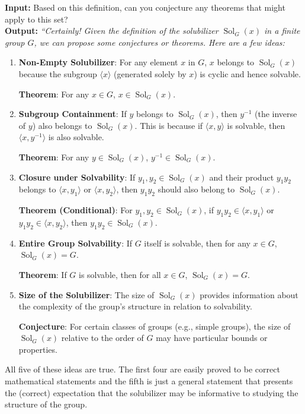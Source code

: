 \documentclass{article}
\begin{document}
\textbf{Input:} Based on this definition, can you conjecture any theorems that might apply to this set?\\
\textbf{Output:} \textit{``Certainly! Given the definition of the solubilizer \( \operatorname{Sol}_G(x) \) in a finite group \( G \), we can propose some conjectures or theorems. Here are a few ideas:}

\begin{enumerate}
    \item \textbf{Non-Empty Solubilizer}: For any element \( x \) in \( G \), \( x \) belongs to \( \operatorname{Sol}_G(x) \) because the subgroup \( \langle x \rangle \) (generated solely by \( x \)) is cyclic and hence solvable.

    \textbf{Theorem}: For any \( x \in G \), \( x \in \operatorname{Sol}_G(x) \).
    \item \textbf{Subgroup Containment}: If \( y \) belongs to \( \operatorname{Sol}_G(x) \), then \( y^{-1} \) (the inverse of \( y \)) also belongs to \( \operatorname{Sol}_G(x) \). This is because if \( \langle x, y \rangle \) is solvable, then \( \langle x, y^{-1} \rangle \) is also solvable. 
    
    \textbf{Theorem}: For any \( y \in \operatorname{Sol}_G(x) \), \( y^{-1} \in \operatorname{Sol}_G(x) \).
    \item \textbf{Closure under Solvability}: If \( y_1, y_2 \in \operatorname{Sol}_G(x) \) and their product \( y_1 y_2 \) belongs to \( \langle x, y_1 \rangle \) or \( \langle x, y_2 \rangle \), then \( y_1 y_2 \) should also belong to \( \operatorname{Sol}_G(x) \).

    \textbf{Theorem (Conditional)}: For \( y_1, y_2 \in \operatorname{Sol}_G(x) \), if \( y_1 y_2 \in \langle x, y_1 \rangle \) or \( y_1 y_2 \in \langle x, y_2 \rangle \), then \( y_1 y_2 \in \operatorname{Sol}_G(x) \).
    \item  \textbf{Entire Group Solvability}: If \( G \) itself is solvable, then for any \( x \in G \), \( \operatorname{Sol}_G(x) = G \).

    \textbf{Theorem}: If \( G \) is solvable, then for all \( x \in G \), \( \operatorname{Sol}_G(x) = G \).
    \item \textbf{Size of the Solubilizer}: The size of \( \operatorname{Sol}_G(x) \) provides information about the complexity of the group's structure in relation to solvability.

    \textbf{Conjecture}: For certain classes of groups (e.g., simple groups), the size of \( \operatorname{Sol}_G(x) \) relative to the order of \( G \) may have particular bounds or properties.
\end{enumerate}
All five of these ideas are true. The first four are easily proved to be correct mathematical statements and the fifth is just a general statement that presents the (correct) expectation that the solubilizer may be informative to studying the structure of the group.
\end{document}
